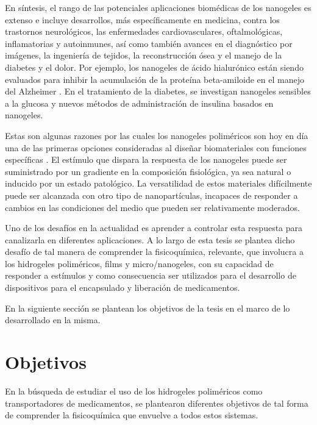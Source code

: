 En s\'intesis, el rango de las potenciales aplicaciones biom\'edicas de los nanogeles es extenso e incluye desarrollos, m\'as espec\'ificamente en medicina, contra los trastornos neurol\'ogicos, las enfermedades cardiovasculares, oftalmol\'ogicas, inflamatorias y autoinmunes, as\'i como tambi\'en avances en el diagn\'ostico por im\'agenes, la ingenier\'ia de tejidos, la reconstrucci\'on \'osea y el manejo de la diabetes y el dolor. Por ejemplo, los nanogeles de \'acido hialur\'onico est\'an siendo evaluados para inhibir la acumulaci\'on de la prote\'ina beta-amiloide en el manejo del Alzheimer \cite{alonso2019nanogel}. En el tratamiento de la diabetes, se investigan nanogeles sensibles a la glucosa \cite{yang2019glucose} y nuevos m\'etodos de administraci\'on de insulina basados en nanogeles.

Estas son algunas razones por las cuales los nanogeles polim\'ericos son hoy en d\'ia una de las primeras opciones consideradas al dise\~nar biomateriales con funciones espec\'ificas \cite{soni2016nanogels,sabir2019polymeric}. El est\'imulo que dispara la respuesta de los nanogeles puede ser suministrado por un gradiente en la composici\'on fisiol\'ogica, ya sea natural o inducido por un estado patol\'ogico. La versatilidad de estos materiales dif\'icilmente puede ser alcanzada con otro tipo de nanopart\'iculas, incapaces de responder a cambios en las condiciones del medio que pueden ser relativamente moderados.

Uno de los desaf\'ios en la actualidad es aprender a controlar esta respuesta para canalizarla en diferentes aplicaciones. A lo largo de esta tesis se plantea dicho desaf\'io de tal manera de comprender la fisicoqu\'imica, relevante,  que involucra a los hidrogeles polim\'ericos, films y micro/nanogeles, con su capacidad de responder a est\'imulos y como consecuencia ser utilizados para el desarrollo de dispositivos para el encapsulado y liberaci\'on de medicamentos.

En la siguiente secci\'on se plantean los objetivos de la tesis en el marco de lo desarrollado en la misma.


\section{Objetivos}

En la b\'usqueda de estudiar el uso de los hidrogeles polim\'ericos como transportadores de medicamentos, se plantearon diferentes objetivos de tal forma de comprender la fisicoqu\'imica que envuelve a todos estos sistemas.


